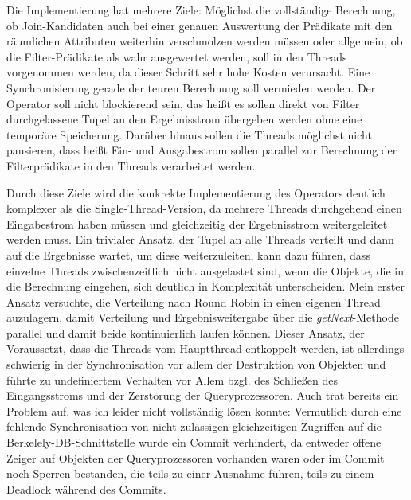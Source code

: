 \documentclass[a4paper,12pt,twoside]{article}
\newcommand{\Fb}[1]{\textit{#1}} %
\begin{document}
Die Implementierung hat mehrere Ziele: Möglichst die vollständige Berechnung, ob Join-Kandidaten auch bei einer genauen Auswertung der Prädikate mit den räumlichen Attributen weiterhin verschmolzen werden müssen oder allgemein, ob die Filter-Prädikate als wahr ausgewertet werden, soll in den Threads vorgenommen werden, da dieser Schritt sehr hohe Kosten verursacht. Eine Synchronisierung gerade der teuren Berechnung soll vermieden werden. Der Operator soll nicht blockierend sein, das heißt es sollen direkt von Filter durchgelassene Tupel an den Ergebnisstrom übergeben werden ohne eine temporäre Speicherung. Darüber hinaus sollen die Threads möglichst nicht pausieren, dass heißt Ein- und Ausgabestrom sollen parallel zur Berechnung der Filterprädikate in den Threads verarbeitet werden.

Durch diese Ziele wird die konkrekte Implementierung des Operators deutlich komplexer als die Single-Thread-Version, da mehrere Threads durchgehend einen Eingabestrom haben müssen und gleichzeitig der Ergebnisstrom weitergeleitet werden muss. Ein trivialer Ansatz, der Tupel an alle Threads verteilt und dann auf die Ergebnisse wartet, um diese weiterzuleiten, kann dazu führen, dass einzelne Threads zwischenzeitlich nicht ausgelastet sind, wenn die Objekte, die in die Berechnung eingehen, sich deutlich in Komplexität unterscheiden. Mein erster Ansatz versuchte, die Verteilung nach Round Robin in einen eigenen Thread auzulagern, damit Verteilung und Ergebnisweitergabe über die \Fb{getNext}-Methode parallel und damit beide kontinuierlich laufen können. Dieser Ansatz, der Voraussetzt, dass die Threads vom Hauptthread entkoppelt werden, ist allerdings schwierig in der Synchronisation vor allem der Destruktion von Objekten und führte zu undefiniertem Verhalten vor Allem bzgl. des Schließen des Eingangsstroms und der Zerstörung der Queryprozessoren. Auch trat bereits ein Problem auf, was ich leider nicht vollständig lösen konnte: Vermutlich durch eine fehlende Synchronisation von nicht zulässigen gleichzeitigen Zugriffen auf die Berkelely-DB-Schnittstelle wurde ein Commit verhindert, da entweder offene Zeiger auf Objekten der Queryprozessoren vorhanden waren oder im Commit noch Sperren bestanden, die teils zu einer Ausnahme führen, teils zu einem Deadlock während des Commits.
\end{document}
